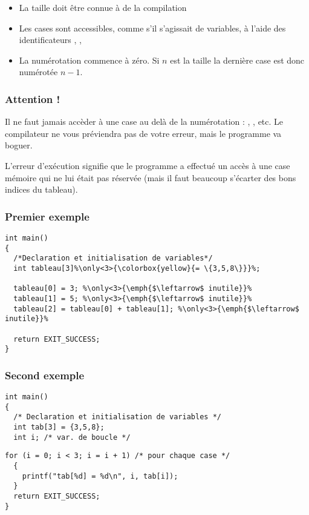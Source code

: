 \documentclass[xcolor=pdftex,svgnames,table]{beamer}
\begin{document}
\begin{frame}[fragile]
{\begin{tabular}{r| c| c|c|c|c| c|c|c|c| c|c|c|c| c}
\end{tabular}\medskip
}
  \begin{itemize}
    \item La taille doit être connue à de la compilation\pause
    \item Les cases sont accessibles, comme s'il s'agissait de variables, à l'aide des identificateurs , , \pause
    \item   La numérotation commence à zéro. Si $n$ est la taille la dernière case est donc numérotée $n - 1$. 
  \end{itemize}
\end{frame}

\begin{frame}
  \frametitle{Attention !}
  \begin{alertenv}
Il ne faut jamais accèder à une case au delà de la numérotation : , , etc. Le compilateur ne vous préviendra pas de votre erreur, mais le programme va boguer. 
\end{alertenv}
\pause

L'erreur d'exécution  signifie que le programme
a effectué un accès à une case mémoire qui ne lui était pas réservée
(mais il faut beaucoup s'écarter des bons indices du tableau).
\end{frame}

\begin{frame}[fragile]
  \frametitle{Premier exemple}
\begin{lstlisting}[escapechar={\%},basicstyle=\ttfamily]
int main()
{
  /*Declaration et initialisation de variables*/
  int tableau[3]%\only<3>{\colorbox{yellow}{= \{3,5,8\}}}%;

  tableau[0] = 3; %\only<3>{\emph{$\leftarrow$ inutile}}%
  tableau[1] = 5; %\only<3>{\emph{$\leftarrow$ inutile}}%
  tableau[2] = tableau[0] + tableau[1]; %\only<3>{\emph{$\leftarrow$ inutile}}%

  return EXIT_SUCCESS;  
}
\end{lstlisting}
\end{frame}

\begin{frame}[fragile]
  \frametitle{Second exemple}
\begin{lstlisting}[basicstyle=\ttfamily\small]
int main()
{
  /* Declaration et initialisation de variables */
  int tab[3] = {3,5,8};
  int i; /* var. de boucle */
\end{lstlisting}
\pause
\begin{lstlisting}[basicstyle=\ttfamily\small]
  for (i = 0; i < 3; i = i + 1) /* pour chaque case */
  {
    printf("tab[%d] = %d\n", i, tab[i]);
  }
  return EXIT_SUCCESS;  
}
\end{lstlisting}
\end{frame}
\end{document}

